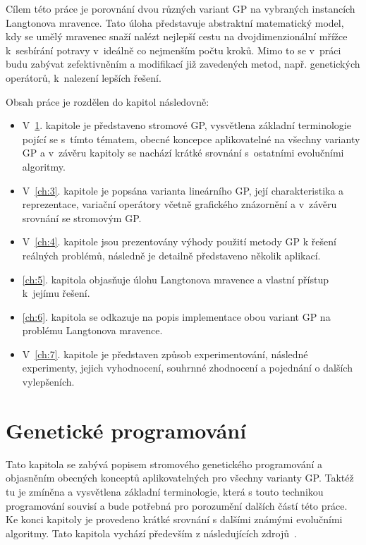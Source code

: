 Cílem této práce je porovnání dvou různých variant GP na vybraných instancích Langtonova mravence. Tato úloha představuje abstraktní matematický model, kdy se umělý mravenec snaží nalézt nejlepší cestu na dvojdimenzionální mřížce k~sesbírání potravy v~ideálně co nejmenším počtu kroků.  Mimo to se v~práci budu zabývat zefektivněním a modifikací již zavedených metod, např. genetických operátorů, k~nalezení lepších řešení. 

Obsah práce je rozdělen do kapitol následovně: 

\begin{itemize}
    \item V~\ref{ch:2}. kapitole je představeno stromové GP, vysvětlena základní terminologie pojící se s~tímto tématem, obecné koncepce aplikovatelné na všechny varianty GP a v~závěru kapitoly se nachází krátké srovnání s~ostatními evolučními algoritmy.
    \item V~\ref{ch:3}. kapitole je popsána varianta lineárního GP, její charakteristika a reprezentace, variační operátory včetně grafického znázornění a v~závěru srovnání se stromovým GP.
    \item V~\ref{ch:4}. kapitole jsou prezentovány výhody použití metody GP k řešení reálných problémů, následně je detailně představeno několik  aplikací.
    \item \ref{ch:5}. kapitola objasňuje úlohu Langtonova mravence a vlastní přístup k~jejímu řešení.
    \item \ref{ch:6}. kapitola se odkazuje na popis implementace obou variant GP na problému Langtonova mravence.
    \item V~\ref{ch:7}. kapitole je představen způsob experimentování, následné experimenty, jejich vyhodnocení, souhrnné zhodnocení a pojednání o dalších vylepšeních.
\end{itemize}


\chapter{Genetické programování}\label{ch:2}
Tato kapitola se zabývá popisem stromového genetického programování a objasněním obecných konceptů aplikovatelných pro všechny varianty GP.  Taktéž tu je zmíněna a vysvětlena základní terminologie, která s touto technikou programování souvisí a bude potřebná pro porozumění dalších částí této práce. Ke konci kapitoly je provedeno krátké srovnání s dalšími známými evolučními algoritmy. Tato kapitola vychází především z následujících zdrojů~\cite{Brameier1998, eiben-2015B, EvoFitLectures, GenProg}. 

